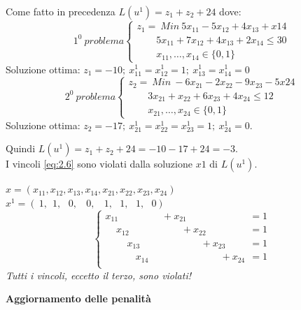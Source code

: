 Come fatto in precedenza $L(u^{1})=z_{1}+z_{2}+24$ dove:
\begin{displaymath}
1^{0}\ problema
\begin{cases}
z_{1}=\ Min\ 5x_{11}-5x_{12}+4x_{13}+x{14}\\
\ \ \ \ \ \ \ \ \ 5x_{11}+7x_{12}+4x_{13}+2x_{14}\le 30\\
\ \ \ \ \ \ \ \ \ x_{11},\dots,x_{14}\in\{0,1\}
\end{cases}
\end{displaymath}
Soluzione ottima: $z_{1}=-10;\ x_{11}^{1}=x_{12}^{1}=1;\ x_{13}^{1}=x_{14}^{1}=0$
\begin{displaymath}
2^{0}\ problema
\begin{cases}
z_{2}=\ Min\ -6x_{21}-2x_{22}-9x_{23}-5x{24}\\
\ \ \ \ \ \ \ \ \ 3x_{21}+x_{22}+6x_{23}+4x_{24}\le 12\\
\ \ \ \ \ \ \ \ \ x_{21},\dots,x_{24}\in\{0,1\}
\end{cases}
\end{displaymath}
Soluzione ottima: $z_{2}=-17;\ x_{21}^{1}=x_{22}^{1}=x_{23}^{1}=1;\ x_{24}^{1}=0$.

Quindi $L(u^{1})=z_{1}+z_{2}+24=-10-17+24=-3$.\\
I vincoli \ref{eq:2.6} sono violati dalla soluzione $x{1}$ di $L(u^{1})$.

$x=(x_{11},x_{12},x_{13},x_{14},x_{21},x_{22},x_{23},x_{24})$\\
$x^{1}=(\ 1,\ \ 1,\ \ \ 0,\ \ \ \ 0,\ \ \ \ 1,\ \ \ 1,\ \ \ 1,\ \ \ 0)$
\begin{displaymath}
\begin{cases}
x_{11}\ \ \ \ \ \ \ \ \ \ \ \ \ \ \ \ \ \ \ \ +x_{21}\ \ \ \ \ \ \ \ \ \ \ \ \ \ \ \ \ \ \ \ \ \ \ \ \ \ \ \ \ =1\\
\ \ \ \ \ x_{12}\ \ \ \ \ \ \ \ \ \ \ \ \ \ \ \ \ \ \ \ \ \ \ \ +x_{22}\ \ \ \ \ \ \ \ \ \ \ \ \ \ \ \ \ \ \ \ =1\\
\ \ \ \ \ \ \ \ \ \ x_{13}\ \ \ \ \ \ \ \ \ \ \ \ \ \ \ \ \ \ \ \ \ \ \ \ \ \ \ \ +x_{23}\ \ \ \ \ \ \ \ \ \ \ =1\\
\ \ \ \ \ \ \ \ \ \ \ \ \ \ x_{14}\ \ \ \ \ \ \ \ \ \ \ \ \ \ \ \ \ \ \ \ \ \ \ \ \ \ \ \ \ \ \ \ \ +x_{24}\ \ =1\\
\end{cases}
\end{displaymath}
\emph{Tutti i vincoli, eccetto il terzo, sono violati!}

\textbf{Aggiornamento delle penalità}

